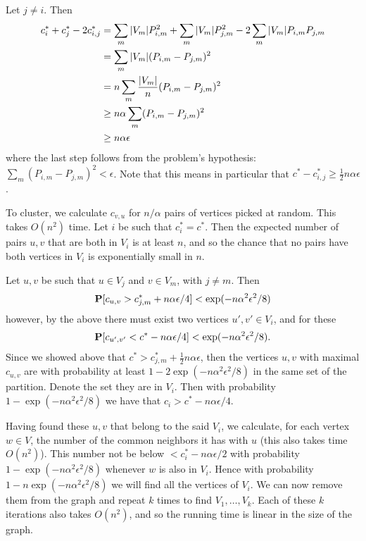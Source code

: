\documentclass[11pt]{article} \usepackage{amssymb}
\newcommand{\eps}{\epsilon} \newcommand{\lam}{\lambda}
\newcommand{\half}{{\textstyle \frac12}}
\begin{document}
\begin{itemize}
  Let $j \neq i$. Then
  \begin{align*}
    c_i^\ast + c_j^\ast - 2c_{i,j}^\ast &= \sum_m|V_m|P_{i,m}^2+\sum_m|V_m|P_{j,m}^2-2\sum_m|V_m|P_{i,m}P_{j,m}
    \\ &= \sum_m|V_m|(P_{i,m}-P_{j,m})^2
    \\ &= n\sum_m{|V_m| \over n}(P_{i,m}-P_{j,m})^2
    \\ &\geq n \alpha \sum_m(P_{i,m}-P_{j,m})^2
    \\ &\geq n \alpha \eps
  \end{align*}
  where the last step follows from the problem's hypothesis:
  $\sum_m(P_{i,m}-P_{j,m})^2<\eps$. Note that this means in particular
  that $c^\ast-c_{i,j}^\ast \geq \half n \alpha \eps$.

  To cluster, we calculate $c_{v,u}$ for $n/\alpha$ pairs of vertices
  picked at random. This takes $O(n^2)$ time.  Let $i$ be such that
  $c_i^\ast=c^\ast$. Then the expected number of pairs $u,v$ that are
  both in $V_i$ is at least $n$, and so the chance that no pairs have
  both vertices in $V_i$ is exponentially small in $n$.

  Let $u,v$ be such that $u \in V_j$ and $v \in V_m$, with $j \neq
  m$. Then
  \begin{align*}
    \P[c_{u,v}>c_{j,m}^\ast+ n \alpha \eps /4] < \exp(-n\alpha^2\eps^2/8)
  \end{align*}
  however, by the above there must exist two vertices $u',v'\in V_i$,
  and for these 
  \begin{align*}
    \P[c_{u',v'}<c^\ast- n \alpha \eps /4] < \exp(-n\alpha^2\eps^2/8).
  \end{align*}
  Since we showed above that $c^\ast>c_{j,m}^\ast+\half n \alpha
  \eps$, then the vertices $u,v$ with maximal $c_{u,v}$ are with
  probability at least $1-2\exp(-n\alpha^2\eps^2/8)$ in the same set
  of the partition. Denote the set they are in $V_i$. Then with
  probability $1-\exp(-n\alpha^2\eps^2/8)$ we have that $c_i>c^\ast- n
  \alpha \eps /4$.

  Having found these $u,v$ that belong to the said $V_i$, we
  calculate, for each vertex $w\in V$, the number of the common
  neighbors it has with $u$ (this also takes time $O(n^2)$). This
  number not be below $<c_i^\ast- n \alpha \eps /2$ with probability
  $1-\exp(-n\alpha^2\eps^2/8)$ whenever $w$ is also in $V_i$. Hence
  with probability $1-n\exp(-n\alpha^2\eps^2/8)$ we will find all the
  vertices of $V_i$. We can now remove them from the graph and repeat
  $k$ times to find $V_1,\ldots,V_k$. Each of these $k$ iterations
  also takes $O(n^2)$, and so the running time is linear in the size
  of the graph.
\end{itemize}
\end{document}
